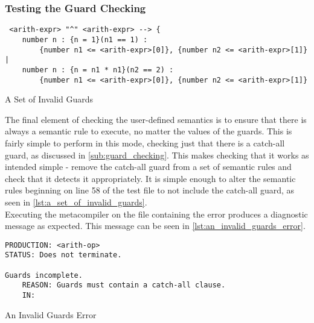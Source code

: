 
\subsubsection{Testing the Guard Checking} %
\label{ssub:testing_the_guard_checking}
\begin{listing}[!htb]
\begin{verbatim}
 <arith-expr> "^" <arith-expr> --> {
    number n : {n = 1}(n1 == 1) :
        {number n1 <= <arith-expr>[0]}, {number n2 <= <arith-expr>[1]} |
    number n : {n = n1 * n1}(n2 == 2) :
        {number n1 <= <arith-expr>[0]}, {number n2 <= <arith-expr>[1]}
\end{verbatim}
\caption{A Set of Invalid Guards}
\label{lst:a_set_of_invalid_guards}
\end{listing}

The final element of checking the user-defined semantics is to ensure that there is always a semantic rule to execute, no matter the values of the guards. 
This is fairly simple to perform in this mode, checking just that there is a catch-all guard, as discussed in \autoref{sub:guard_checking}. 
This makes checking that it works as intended simple - remove the catch-all guard from a set of semantic rules and check that it detects it appropriately.
It is simple enough to alter the semantic rules beginning on line 58 of the test file to not include the catch-all guard, as seen in \autoref{lst:a_set_of_invalid_guards}. \\

Executing the metacompiler on the file containing the error produces a diagnostic message as expected.
This message can be seen in \autoref{lst:an_invalid_guards_error}.

\begin{listing}[!htb]
\begin{verbatim}
PRODUCTION: <arith-op>
STATUS: Does not terminate.

Guards incomplete.
    REASON: Guards must contain a catch-all clause.
    IN:
\end{verbatim}
\caption{An Invalid Guards Error}
\label{lst:an_invalid_guards_error}
\end{listing}




